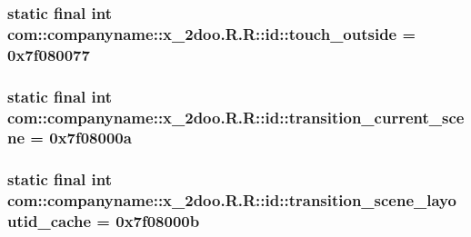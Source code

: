 \hypertarget{classcom_1_1companyname_1_1x__2doo_1_1_r_1_1id_32e7eae15c172bd15a81ebee1e74cc66}{
\subsubsection[{touch\_\-outside}]{\setlength{\rightskip}{0pt plus 5cm}static final int com::companyname::x\_\-2doo.R.R::id::touch\_\-outside = 0x7f080077}}
\label{classcom_1_1companyname_1_1x__2doo_1_1_r_1_1id_32e7eae15c172bd15a81ebee1e74cc66}


\hypertarget{classcom_1_1companyname_1_1x__2doo_1_1_r_1_1id_533a64afad1f241ca02827967d105e1d}{
\subsubsection[{transition\_\-current\_\-scene}]{\setlength{\rightskip}{0pt plus 5cm}static final int com::companyname::x\_\-2doo.R.R::id::transition\_\-current\_\-scene = 0x7f08000a}}
\label{classcom_1_1companyname_1_1x__2doo_1_1_r_1_1id_533a64afad1f241ca02827967d105e1d}


\hypertarget{classcom_1_1companyname_1_1x__2doo_1_1_r_1_1id_5bb2233c189243473842ce51cb570310}{
\subsubsection[{transition\_\-scene\_\-layoutid\_\-cache}]{\setlength{\rightskip}{0pt plus 5cm}static final int com::companyname::x\_\-2doo.R.R::id::transition\_\-scene\_\-layoutid\_\-cache = 0x7f08000b}}
\label{classcom_1_1companyname_1_1x__2doo_1_1_r_1_1id_5bb2233c189243473842ce51cb570310}


